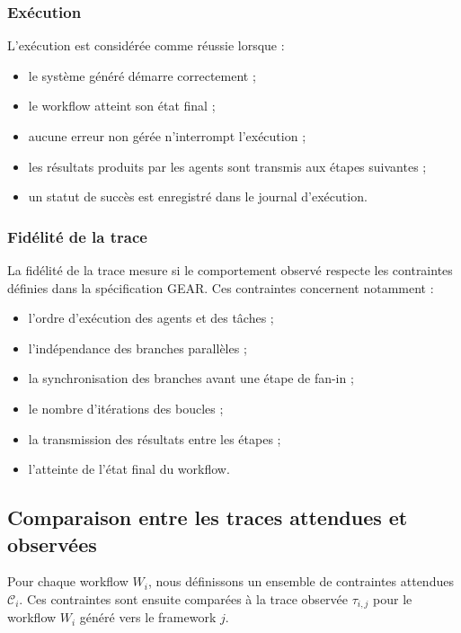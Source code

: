 \subsubsection{Exécution}

L'exécution est considérée comme réussie lorsque :

\begin{itemize}
    \item le système généré démarre correctement ;
    \item le workflow atteint son état final ;
    \item aucune erreur non gérée n'interrompt l'exécution ;
    \item les résultats produits par les agents sont transmis aux
    étapes suivantes ;
    \item un statut de succès est enregistré dans le journal
    d'exécution.
\end{itemize}


\subsubsection{Fidélité de la trace}

La fidélité de la trace mesure si le comportement observé respecte les
contraintes définies dans la spécification GEAR. Ces contraintes
concernent notamment :

\begin{itemize}
    \item l'ordre d'exécution des agents et des tâches ;
    \item l'indépendance des branches parallèles ;
    \item la synchronisation des branches avant une étape de fan-in ;
    \item le nombre d'itérations des boucles ;
    \item la transmission des résultats entre les étapes ;
    \item l'atteinte de l'état final du workflow.
\end{itemize}


\subsection{Comparaison entre les traces attendues et observées}
\label{subsec:comparaison-traces}

Pour chaque workflow $W_i$, nous définissons un ensemble de contraintes
attendues $\mathcal{C}_{i}$. Ces contraintes sont ensuite comparées à
la trace observée $\tau_{i,j}$ pour le workflow $W_i$ généré vers le
framework $j$.

